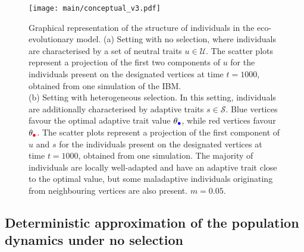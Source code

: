 \begin{figure}[t]%
  \centering
  \texttt{[image: main/conceptual\_v3.pdf]}
  \caption{\small Graphical representation of the structure of individuals in the eco-evolutionary model. (a) Setting with no selection, where individuals are characterised by a set of neutral traits $u \in \mathcal{U}$. The scatter plots represent a projection of the first two components of $u$ for the individuals present on the designated vertices at time $t=1000$, obtained from one simulation of the IBM.\\
  (b) Setting with heterogeneous selection. In this setting, individuals are additionally characterised by adaptive traits $s \in \mathcal{S}$. Blue vertices favour the optimal adaptive trait value $\theta_{\bcirc}$, while red vertices favour $\theta_{\rcirc}$. The scatter plots represent a projection of the first component of $u$ and $s$ for the individuals present on the designated vertices at time $t = 1000$, obtained from one simulation. The majority of individuals are locally well-adapted and have an adaptive trait close to the optimal value, but some maladaptive individuals originating from neighbouring vertices are also present. $m = 0.05$.}
  \label{fig:conceptual}
\end{figure}
\FloatBarrier

\subsection{Deterministic approximation of the population dynamics under no selection}\label{sec:212}

